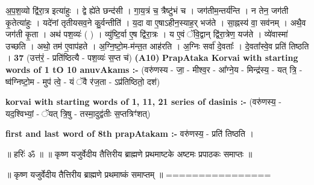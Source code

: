 \documentclass[17pt]{extarticle}
\begin{document}
                  अ॒प॒श॒व्यो द्वि॑रा॒त्र इत्या॑हुः । द्वे ह्ये॑ते छन्द॑सी । गा॒य॒त्रं च॒ त्रैष्टु॑भं च । जग॑तीम॒न्तर्य॑न्ति । न तेन॒ जग॑ती कृ॒तेत्या॑हुः । यदे॑नां तृतीयसव॒ने कु॒र्वन्तीति॑ । य॒दा वा ए॒षाऽहीन॒स्याह॒र् भज॑ते । सा॒ह्नस्य॑ वा॒ सव॑नम् । अथै॒व जग॑ती कृ॒ता । अथ॑ पश॒व्यः॑ ( ) । व्यु॑ष्टि॒र्वा ए॒ष द्वि॑रा॒त्रः । य ए॒वं ॅवि॒द्वान् द्वि॑रा॒त्रेण॒ यज॑ते । व्ये॑वास्मा॑ उच्छति । अथो॒ तम॑ ए॒वाप॑हते । अ॒ग्नि॒ष्टो॒म-म॑न्त॒त आह॑रति । अ॒ग्निः सर्वा॑ दे॒वताः᳚ । दे॒वता᳚स्वे॒व प्रति॑ तिष्ठति । \textbf{ 37} \newline
                  \newline
                                    (उत्त॑रं॒ - प्रति॑ष्ठित्यै - पश॒व्यः॑ स॒प्त च॑) \textbf{(A10)} \newline \newline
                \textbf{PrapAtaka Korvai with starting  words of 1 tO 10 anuvAkams :-} \newline
        (वरु॑णस्य - जा॒ - मीश्व॒र - आ᳚ग्ने॒य - मिन्द्र॑स्य॒ - यत् त्रि॒ - ष्व॑ग्निष्टो॒म - मुप॑ त्वे॒ - यं ॅवै र॑ज॒ता - ऽप्र॑तिष्ठितो॒ दश॑) \newline

        \textbf{korvai with starting words of 1, 11, 21 series of dasinis :-} \newline
        (वरु॑णस्य॒ - यद॒श्विभ्यां॒ - ॅयत् त्रि॒षु - तस्मा॒दुद्व॑तीः स॒प्तत्रिꣳ॑शत्) \newline

        \textbf{first and last  word of 8th prapAtakam :-} \newline
        वरु॑णस्य॒ - प्रति॑ तिष्ठति । \newline 

       

        ॥ हरिः॑ ॐ ॥
॥ कृष्ण यजुर्वेदीय तैत्तिरीय ब्राह्मणे प्रथमाष्टके अष्टमः प्रपाठकः समाप्तः ॥

॥ कृष्ण यजुर्वेदीय तैत्तिरीय ब्राह्मणे प्रथमाष्कं समाप्तम् ॥
================ \newline
        \pagebreak
        
        
        
\end{document}
